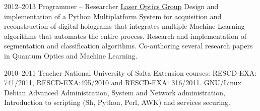 \documentclass[11pt,a4paper]{moderncv}
\begin{document}
    \cventry
        {2012--2013}
        {Programmer -- Researcher}
        {\href{http://github.com/pointtonull/golsoft}{Laser Optics Group}} {} {}
        {
            Design and implementation of a Python Multiplatform System for                                        %
                acquisition and reconstruction of digital holograms that                                          %
                integrates multiple Machine Learning algorithms that automates                                    %
                the entire process.                                                                               %
            Research and implementation of segmentation and classification                                        %
                algorithms.                                                                                       %
            Co-authoring several research papers in Quantum Optics and Machine                                    %
                Learning.                                                                                         %
        }

    \cventry                                                                                                      %
        {2010--2011}                                                                                              %
        {Teacher}                                                                                                 %
        {National University of Salta} {} {}                                                                      %
        {                                                                                                         %
            Extension courses: RESCD-EXA: 741/2011,  RESCD-EXA:495/2010 and                                       %
                RESCD-EXA: 316/2011. GNU/Linux Debian Advanced Administration,                                    %
                System and Network administration, Introduction to scripting                                      %
                (Sh, Python, Perl, AWK) and services securing.                                                    %
        }                                                                                                         %
\end{document}
